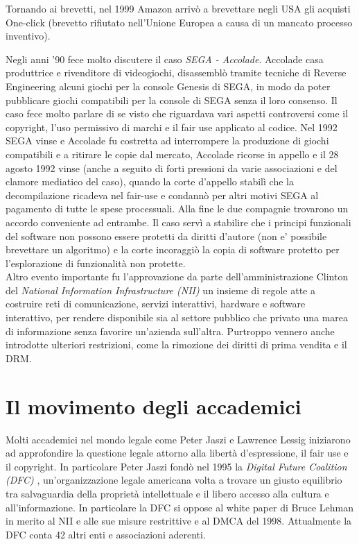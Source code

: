 Tornando ai brevetti, nel 1999 Amazon arrivò a brevettare negli USA gli acquisti One-click (brevetto rifiutato nell'Unione Europea a causa di un mancato processo inventivo).

Negli anni '90 fece molto discutere il caso \textit{SEGA - Accolade}. Accolade casa produttrice e rivenditore di videogiochi, disassemblò tramite tecniche di Reverse Engineering alcuni giochi per la console Genesis di SEGA, in modo da poter pubblicare giochi compatibili per la console di SEGA senza il loro consenso. Il caso fece molto parlare di se visto che riguardava vari aspetti controversi come il copyright, l'uso permissivo di marchi e il fair use applicato al codice.
Nel 1992 SEGA vinse e Accolade fu costretta ad interrompere la produzione di giochi compatibili e a ritirare le copie dal mercato, Accolade ricorse in appello e il 28 agosto 1992 vinse (anche a seguito di forti pressioni da varie associazioni e del clamore mediatico del caso), quando la corte d'appello stabilì che la decompilazione ricadeva nel fair-use e condannò per altri motivi SEGA al pagamento di tutte le spese processuali. Alla fine le due compagnie trovarono un accordo conveniente ad entrambe. Il caso servì a stabilire che i principi funzionali del software non possono essere protetti da diritti d'autore (non e' possibile brevettare un algoritmo) e la corte incoraggiò la copia di software protetto per l'esplorazione di funzionalità non protette.\\

Altro evento importante fu l'approvazione da parte dell'amministrazione Clinton del \textit{National Information Infrastructure (NII)} un insieme di regole atte a costruire reti di comunicazione, servizi interattivi, hardware e software interattivo, per rendere disponibile sia al settore pubblico che privato una marea di informazione senza favorire un'azienda sull'altra. Purtroppo vennero anche introdotte ulteriori restrizioni, come la rimozione dei diritti di prima vendita e il DRM.

\section{Il movimento degli accademici}

Molti accademici nel mondo legale come Peter Jaszi e Lawrence Lessig iniziarono ad approfondire la questione legale attorno alla libertà d'espressione, il fair use e il copyright. In particolare Peter Jaszi fondò nel 1995 la \textit{Digital Future Coalition (DFC)} , un'organizzazione legale americana volta a trovare un giusto equilibrio tra salvaguardia della proprietà intellettuale e il libero accesso alla cultura e all'informazione. In particolare la DFC si oppose al white paper di Bruce Lehman in merito al NII e alle sue misure restrittive e al DMCA del 1998. Attualmente la DFC conta 42 altri enti e associazioni aderenti.\\

